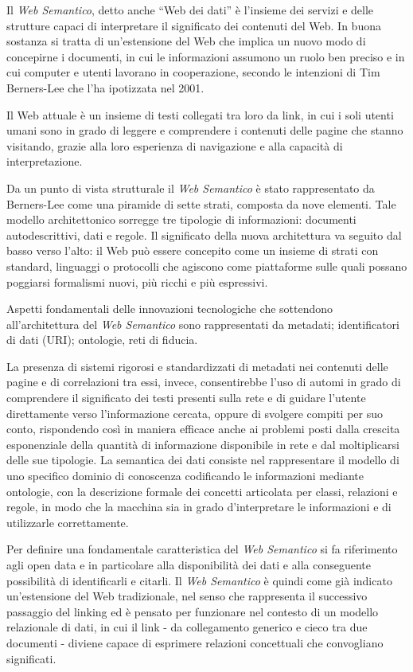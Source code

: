 \documentclass[
  b5paper,
  twoside,
  12pt,
  chapterprefix=false,
  bibliography=totocnumbered,
  parskip=false]{scrbook}
\begin{document}
Il \emph{Web Semantico}, detto anche \enquote{Web dei dati} è l'insieme dei servizi
e delle strutture capaci di interpretare il significato dei contenuti
del Web. In buona sostanza si tratta di un'estensione del Web che
implica un nuovo modo di concepirne i documenti, in cui le informazioni
assumono un ruolo ben preciso e in cui computer e utenti lavorano in
cooperazione, secondo le intenzioni di Tim Berners-Lee che l'ha
ipotizzata nel 2001.

Il Web attuale è un insieme di testi collegati tra loro da link, in cui
i soli utenti umani sono in grado di leggere e comprendere i contenuti
delle pagine che stanno visitando, grazie alla loro esperienza di
navigazione e alla capacità di interpretazione.

Da un punto di vista strutturale il \emph{Web Semantico} è stato
rappresentato da Berners-Lee come una piramide di sette strati, composta
da nove elementi. Tale modello architettonico sorregge tre tipologie di
informazioni: documenti autodescrittivi, dati e regole. Il significato
della nuova architettura va seguito dal basso verso l'alto: il Web può
essere concepito come un insieme di strati con standard, linguaggi o
protocolli che agiscono come piattaforme sulle quali possano poggiarsi
formalismi nuovi, più ricchi e più espressivi.

Aspetti fondamentali delle innovazioni tecnologiche che sottendono
all'architettura del \emph{Web Semantico} sono rappresentati da metadati;
identificatori di dati (URI); ontologie, reti di fiducia.

La presenza di sistemi rigorosi e standardizzati di metadati nei
contenuti delle pagine e di correlazioni tra essi, invece, consentirebbe
l'uso di automi in grado di comprendere il significato dei testi
presenti sulla rete e di guidare l'utente direttamente verso
l'informazione cercata, oppure di svolgere compiti per suo conto,
rispondendo così in maniera efficace anche ai problemi posti dalla
crescita esponenziale della quantità di informazione disponibile in rete
e dal moltiplicarsi delle sue tipologie. La semantica dei dati consiste
nel rappresentare il modello di uno specifico dominio di conoscenza
codificando le informazioni mediante ontologie, con la descrizione
formale dei concetti articolata per classi, relazioni e regole, in modo
che la macchina sia in grado d'interpretare le informazioni e di
utilizzarle correttamente.

Per definire una fondamentale caratteristica del \emph{Web Semantico} si fa
riferimento agli open data e in particolare alla disponibilità dei dati
e alla conseguente possibilità di identificarli e citarli. Il \emph{Web
Semantico} è quindi come già indicato un'estensione del Web
tradizionale, nel senso che rappresenta il successivo passaggio del
linking ed è pensato per funzionare nel contesto di un modello
relazionale di dati, in cui il link - da collegamento generico e cieco
tra due documenti - diviene capace di esprimere relazioni concettuali
che convogliano significati.
\end{document}
